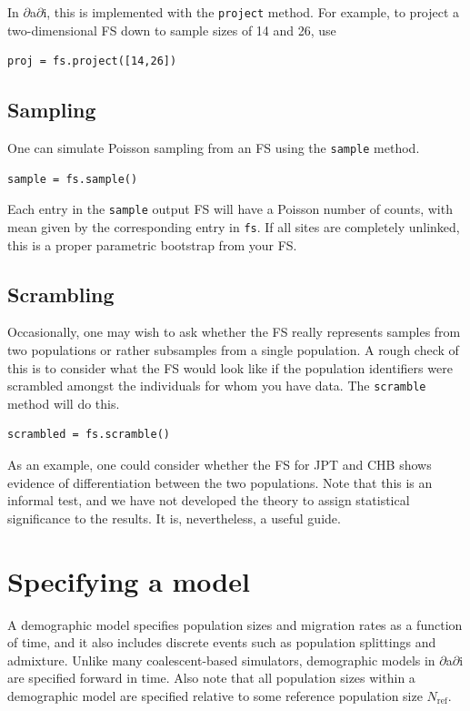 \documentclass[12pt]{article}
\makeatletter
\newcommand{\dadi}{$\partial$a$\partial$i\xspace}
\newcommand{\Nref}{\ensuremath{N_\text{ref}}\xspace}
\newcommand{\py}[1]{\lstinline[language=Python, showstringspaces=False]@#1@}
\makeatother
\begin{document}
In \dadi, this is implemented with the \py{project} method.
For example, to project a two-dimensional FS down to sample sizes of 14 and 26, use
\begin{lstlisting}
proj = fs.project([14,26])
\end{lstlisting}

\subsection{Sampling}

One can simulate Poisson sampling from an FS using the \py{sample} method.
\begin{lstlisting}
sample = fs.sample()
\end{lstlisting}
Each entry in the \py{sample} output FS will have a Poisson number of counts, with mean given by the corresponding entry in \py{fs}.
If all sites are completely unlinked, this is a proper parametric bootstrap from your FS.

\subsection{Scrambling}

Occasionally, one may wish to ask whether the FS really represents samples from two populations or rather subsamples from a single population.
A rough check of this is to consider what the FS would look like if the population identifiers were scrambled amongst the individuals for whom you have data.
The \py{scramble} method will do this.
\begin{lstlisting}
scrambled = fs.scramble()
\end{lstlisting}
As an example, one could consider whether the FS for JPT and CHB shows evidence of differentiation between the two populations.
Note that this is an informal test, and we have not developed the theory to assign statistical significance to the results.
It is, nevertheless, a useful guide.

\section{Specifying a model}

A demographic model specifies population sizes and migration rates as a function of time, and it also includes discrete events such as population splittings and admixture.
Unlike many coalescent-based simulators, demographic models in \dadi are specified forward in time.
Also note that all population sizes within a demographic model are specified relative to some reference population size \Nref.
\end{document}
